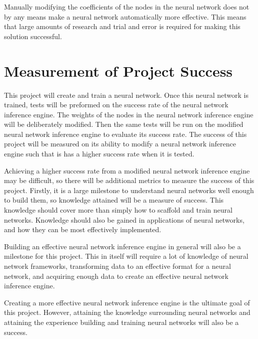 \documentclass[10pt, draftclsnofoot, onecolumn]{IEEEtran}
\begin{document}
Manually modifying the coefficients of the nodes in the neural network does not by any means make a neural network automatically more effective. This means that large amounts of research and trial and error is required for making this solution successful.

\section{Measurement of Project Success}
This project will create and train a neural network. Once this neural network is trained, tests will be preformed on the success rate of the neural network inference engine. The weights of the nodes in the neural network inference engine will be deliberately modified. Then the same tests will be run on the modified neural network inference engine to evaluate its success rate. The success of this project will be measured on its ability to modify a neural network inference engine such that is has a higher success rate when it is tested.

Achieving a higher success rate from a modified neural network inference engine may be difficult, so there will be additional metrics to measure the success of this project. Firstly, it is a large milestone to understand neural networks well enough to build them, so knowledge attained will be a measure of success. This knowledge should cover more than simply how to scaffold and train neural networks. Knowledge should also be gained in applications of neural networks, and how they can be most effectively implemented.

Building an effective neural network inference engine in general will also be a milestone for this project. This in itself will require a lot of knowledge of neural network frameworks, transforming data to an effective format for a neural network, and acquiring enough data to create an effective neural network inference engine.

Creating a more effective neural network inference engine is the ultimate goal of this project. However, attaining the knowledge surrounding neural networks and attaining the experience building and training neural networks will also be a success.
\end{document}
